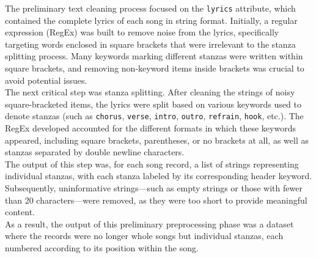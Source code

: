 The preliminary text cleaning process focused on the \texttt{lyrics} attribute,
which contained the complete lyrics of each song in string format.
Initially, a regular expression (RegEx) was built to remove noise from the
lyrics, specifically targeting words enclosed in square brackets that were
irrelevant to the stanza splitting process. Many keywords marking different
stanzas were written within square brackets, and removing non-keyword items
inside brackets was crucial to avoid potential issues.\\

The next critical step was stanza splitting. After cleaning the strings of
noisy square-bracketed items, the lyrics were split based on various keywords
used to denote stanzas (such as \texttt{chorus}, \texttt{verse}, \texttt{intro},
\texttt{outro}, \texttt{refrain}, \texttt{hook}, etc.).
The RegEx developed accounted for the different formats in which these keywords
appeared, including square brackets, parentheses, or no brackets at all, as well
as stanzas separated by double newline characters.\\

The output of this step was, for each song record, a list of strings
representing individual stanzas, with each stanza labeled by its corresponding
header keyword.\\

Subsequently, uninformative strings—such as empty strings or those with fewer
than 20 characters—were removed, as they were too short to provide meaningful
content.\\

As a result, the output of this preliminary preprocessing phase was a dataset
where the records were no longer whole songs but individual stanzas, each
numbered according to its position within the song.\\

